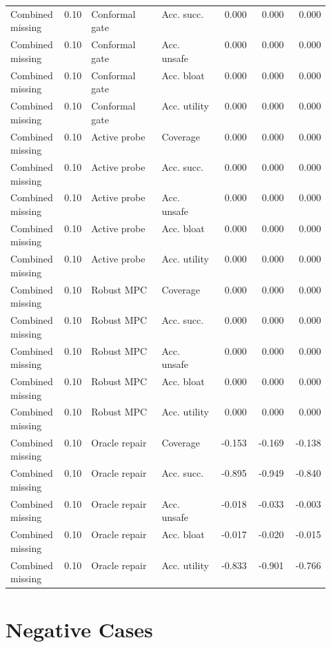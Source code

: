 \documentclass{article}
\begin{document}
\begin{center}
\begin{longtable}{p{0.14\linewidth}rp{0.22\linewidth}p{0.18\linewidth}rrr}
Combined missing & 0.10 & Conformal gate & Acc. succ. & 0.000 & 0.000 & 0.000\\
Combined missing & 0.10 & Conformal gate & Acc. unsafe & 0.000 & 0.000 & 0.000\\
Combined missing & 0.10 & Conformal gate & Acc. bloat & 0.000 & 0.000 & 0.000\\
Combined missing & 0.10 & Conformal gate & Acc. utility & 0.000 & 0.000 & 0.000\\
Combined missing & 0.10 & Active probe & Coverage & 0.000 & 0.000 & 0.000\\
Combined missing & 0.10 & Active probe & Acc. succ. & 0.000 & 0.000 & 0.000\\
Combined missing & 0.10 & Active probe & Acc. unsafe & 0.000 & 0.000 & 0.000\\
Combined missing & 0.10 & Active probe & Acc. bloat & 0.000 & 0.000 & 0.000\\
Combined missing & 0.10 & Active probe & Acc. utility & 0.000 & 0.000 & 0.000\\
Combined missing & 0.10 & Robust MPC & Coverage & 0.000 & 0.000 & 0.000\\
Combined missing & 0.10 & Robust MPC & Acc. succ. & 0.000 & 0.000 & 0.000\\
Combined missing & 0.10 & Robust MPC & Acc. unsafe & 0.000 & 0.000 & 0.000\\
Combined missing & 0.10 & Robust MPC & Acc. bloat & 0.000 & 0.000 & 0.000\\
Combined missing & 0.10 & Robust MPC & Acc. utility & 0.000 & 0.000 & 0.000\\
Combined missing & 0.10 & Oracle repair & Coverage & -0.153 & -0.169 & -0.138\\
Combined missing & 0.10 & Oracle repair & Acc. succ. & -0.895 & -0.949 & -0.840\\
Combined missing & 0.10 & Oracle repair & Acc. unsafe & -0.018 & -0.033 & -0.003\\
Combined missing & 0.10 & Oracle repair & Acc. bloat & -0.017 & -0.020 & -0.015\\
Combined missing & 0.10 & Oracle repair & Acc. utility & -0.833 & -0.901 & -0.766\\
\bottomrule
\end{longtable}
\normalsize
\end{center}

\section{Negative Cases}
\end{document}
